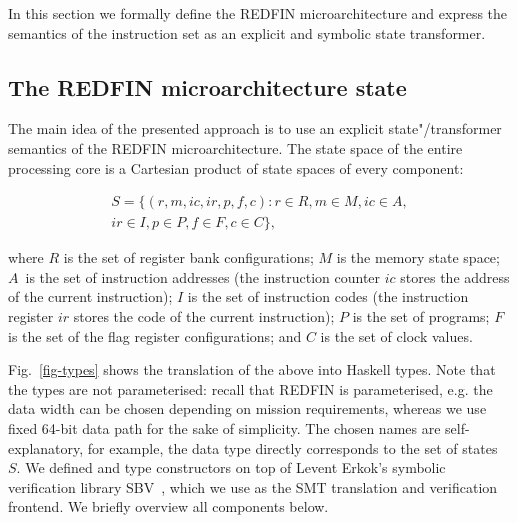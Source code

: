 
In this section we formally define the REDFIN microarchitecture and express the
semantics of the instruction set as an explicit and symbolic state transformer.


\subsection{The REDFIN microarchitecture state}


The main idea of the presented approach is to use an explicit state"/transformer
semantics of the REDFIN microarchitecture. The state space of the entire
processing core is a Cartesian product of state spaces of every component:

\begin{equation*}
\begin{split}
S=\{(r, m, ic, ir, p, f, c) : r \in R, m \in M, ic \in A, \\ir \in I,
p \in P, f \in F, c \in C\},
\end{split}
\end{equation*}

\noindent
where $R$ is the set of register bank configurations;
$M$ is the memory state space;
$A$~is the set of instruction addresses (the instruction counter $ic$ stores the
address of the current instruction);
$I$ is the set of instruction codes (the instruction register $ir$ stores the
code of the current instruction);
$P$ is the set of programs;
$F$ is the set of the flag register configurations; and
$C$ is the set of clock values.

Fig.~\ref{fig-types} shows the translation of the above into Haskell types. Note
that the types are not parameterised: recall that REDFIN is parameterised, e.g.
the data width can be chosen depending on mission requirements, whereas we use fixed
64-bit data path for the sake of simplicity. The chosen names are self-explanatory,
for example, the data type  directly corresponds to the set of states~$S$.
We defined  and  type constructors on top of
Levent Erkok's symbolic verification library SBV~\cite{SBV}, which we use as the
SMT translation and verification frontend.  We briefly overview all  components below.

